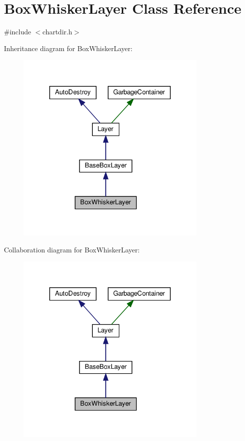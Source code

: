 \hypertarget{class_box_whisker_layer}{}\section{Box\+Whisker\+Layer Class Reference}
\label{class_box_whisker_layer}


{\ttfamily \#include $<$chartdir.\+h$>$}



Inheritance diagram for Box\+Whisker\+Layer\+:
\nopagebreak
\begin{figure}[H]
\begin{center}
\leavevmode
\includegraphics[width=264pt]{class_box_whisker_layer__inherit__graph}
\end{center}
\end{figure}


Collaboration diagram for Box\+Whisker\+Layer\+:
\nopagebreak
\begin{figure}[H]
\begin{center}
\leavevmode
\includegraphics[width=264pt]{class_box_whisker_layer__coll__graph}
\end{center}
\end{figure}
